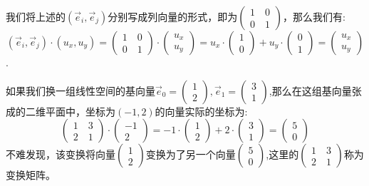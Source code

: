 \documentclass[UTF8]{article}
\begin{document}
我们将上述的$(\vec{e}_i, \vec{e}_j)$分别写成列向量的形式，即为$\left(
\begin{array}{l}
1\quad 0 \\ 
0\quad 1
\end{array}
\right)$，那么我们有:$$(\vec{e}_i, \vec{e}_j)\cdot(u_x, u_y) = \left(
\begin{array}{l}
1\quad 0 \\ 
0\quad 1
\end{array}
\right) \cdot \left(
\begin{array}{l}
u_x \\ 
u_y
\end{array}
\right) = u_x\cdot \left(
\begin{array}{l}
1 \\ 
0
\end{array}
\right) + u_y\cdot \left(
\begin{array}{l}
0 \\ 
1
\end{array}
\right) = \left(
\begin{array}{l}
u_x \\ 
u_y
\end{array}
\right)$$.

如果我们换一组线性空间的基向量$\vec{e}_0 = \left(
\begin{array}{l}
1 \\ 
2
\end{array}
\right), \vec{e}_1 = \left(
\begin{array}{l}
3 \\ 
1
\end{array}
\right)$,那么在这组基向量张成的二维平面中，坐标为$(-1, 2)$的向量实际的坐标为:$$\left(
\begin{array}{l}
1\quad 3 \\ 
2\quad 1
\end{array}
\right) \cdot \left(
\begin{array}{l}
-1 \\ 
2
\end{array}
\right) = -1\cdot \left(
\begin{array}{l}
1 \\ 
2
\end{array}
\right) + 2\cdot \left(
\begin{array}{l}
3 \\ 
1
\end{array}
\right) = \left(
\begin{array}{l}
5 \\ 
0
\end{array}
\right)$$
不难发现，该变换将向量$\left(
\begin{array}{l}
1 \\ 
2
\end{array}
\right)$变换为了另一个向量$\left(
\begin{array}{l}
5 \\ 
0
\end{array}
\right)$,这里的$\left(
\begin{array}{l}
1\quad 3 \\ 
2\quad 1
\end{array}
\right)$称为变换矩阵。
\end{document}
